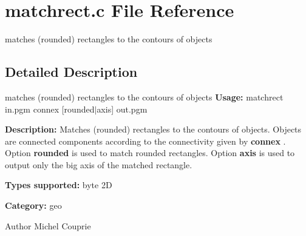 \section{matchrect.c File Reference}
\label{matchrect_8c}


matches (rounded) rectangles to the contours of objects  




\subsection{Detailed Description}
matches (rounded) rectangles to the contours of objects {\bfseries Usage:} matchrect in.pgm connex [rounded$|$axis] out.pgm

{\bfseries Description:} Matches (rounded) rectangles to the contours of objects. Objects are connected components according to the connectivity given by {\bfseries connex} . Option {\bfseries rounded} is used to match rounded rectangles. Option {\bfseries axis} is used to output only the big axis of the matched rectangle.

{\bfseries Types supported:} byte 2D

{\bfseries Category:} geo

\begin{DoxyAuthor}{Author}
Michel Couprie 
\end{DoxyAuthor}

